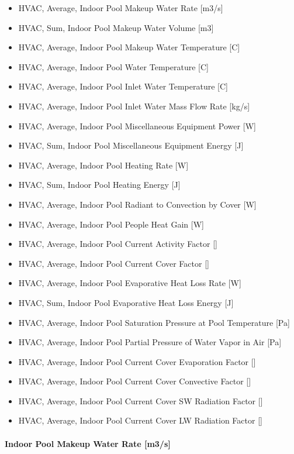 \begin{itemize}
\tightlist
\item
  HVAC, Average, Indoor Pool Makeup Water Rate {[}m3/s{]}
\item
  HVAC, Sum, Indoor Pool Makeup Water Volume {[}m3{]}
\item
  HVAC, Average, Indoor Pool Makeup Water Temperature {[}C{]}
\item
  HVAC, Average, Indoor Pool Water Temperature {[}C{]}
\item
  HVAC, Average, Indoor Pool Inlet Water Temperature {[}C{]}
\item
  HVAC, Average, Indoor Pool Inlet Water Mass Flow Rate {[}kg/s{]}
\item
  HVAC, Average, Indoor Pool Miscellaneous Equipment Power {[}W{]}
\item
  HVAC, Sum, Indoor Pool Miscellaneous Equipment Energy {[}J{]}
\item
  HVAC, Average, Indoor Pool Heating Rate {[}W{]}
\item
  HVAC, Sum, Indoor Pool Heating Energy {[}J{]}
\item
  HVAC, Average, Indoor Pool Radiant to Convection by Cover {[}W{]}
\item
  HVAC, Average, Indoor Pool People Heat Gain {[}W{]}
\item
  HVAC, Average, Indoor Pool Current Activity Factor {[]}
\item
  HVAC, Average, Indoor Pool Current Cover Factor {[]}
\item
  HVAC, Average, Indoor Pool Evaporative Heat Loss Rate {[}W{]}
\item
  HVAC, Sum, Indoor Pool Evaporative Heat Loss Energy {[}J{]}
\item
  HVAC, Average, Indoor Pool Saturation Pressure at Pool Temperature {[}Pa{]}
\item
  HVAC, Average, Indoor Pool Partial Pressure of Water Vapor in Air {[}Pa{]}
\item
  HVAC, Average, Indoor Pool Current Cover Evaporation Factor {[]}
\item
  HVAC, Average, Indoor Pool Current Cover Convective Factor {[]}
\item
  HVAC, Average, Indoor Pool Current Cover SW Radiation Factor {[]}
\item
  HVAC, Average, Indoor Pool Current Cover LW Radiation Factor {[]}
\end{itemize}

\paragraph{Indoor Pool Makeup Water Rate {[}m3/s{]}}\label{indoor-pool-makeup-water-rate-m3s}

